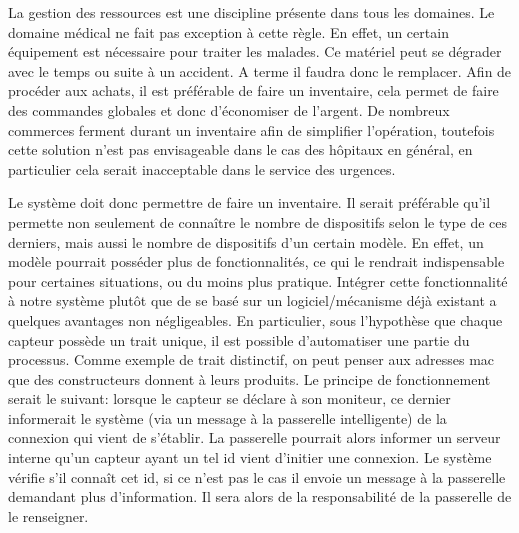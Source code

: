 La gestion des ressources est une discipline présente dans tous les domaines. Le domaine médical ne fait pas exception à cette
règle. En effet, un certain équipement est nécessaire pour traiter les malades. Ce matériel peut se dégrader avec le temps ou
suite à un accident. A terme il faudra donc le remplacer. Afin de procéder aux achats, il est préférable de faire un inventaire,
cela permet de faire des commandes globales et donc d'économiser de l'argent. De nombreux commerces ferment durant un inventaire
afin de simplifier l'opération, toutefois cette solution n'est pas envisageable dans le cas des hôpitaux en général, en
particulier cela serait inacceptable dans le service des urgences.
\newline

Le système doit donc permettre de faire un inventaire. Il serait préférable qu'il permette non seulement de connaître le nombre de
dispositifs selon le type de ces derniers, mais aussi le nombre de dispositifs d'un certain modèle. En effet, un modèle pourrait
posséder plus de fonctionnalités, ce qui le rendrait indispensable pour certaines situations, ou du moins plus pratique. Intégrer
cette fonctionnalité à notre système plutôt que de se basé sur un logiciel/mécanisme déjà existant a quelques avantages
non négligeables. En particulier, sous l'hypothèse que chaque capteur possède un trait unique, il est possible d'automatiser une
partie du processus. Comme exemple de trait distinctif, on peut penser aux adresses mac que des constructeurs donnent à leurs
produits. Le principe de fonctionnement serait le suivant: lorsque le capteur se déclare à son moniteur, ce dernier informerait le
système (via un message à la passerelle intelligente) de la connexion qui vient de s'établir. La passerelle pourrait alors
informer un serveur interne qu'un capteur ayant un tel id vient d'initier une connexion. Le système vérifie s'il connaît cet id,
si ce n'est pas le cas il envoie un message à la passerelle demandant plus d'information. Il sera alors de la responsabilité de la
passerelle de le renseigner.

